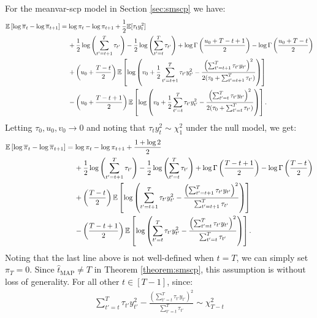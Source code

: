 For the meanvar-scp model in Section \ref{sec:smscp} we have:
\small
\begin{align*}
    \mathbb{E}\left[\log\overline{\pi}_t - \log \overline{\pi}_{t+1} \right] &= \log \pi_t- \log \pi_{t+1} + \frac{1}{2} \mathbb{E}[\tau_ty_t^2] \\
    &\quad \: + \frac{1}{2}\log\left(\sum_{t'=t+1}^T \tau_{t'}\right) - \frac{1}{2}\log\left(\sum_{t'=t}^T \tau_{t'}\right) + \log \Gamma\left(\frac{u_0 + T-t+1}{2}\right) - \log \Gamma\left(\frac{u_0 + T-t}{2}\right)  \\
    &\quad \: + \left(u_0 + \frac{T - t}{2}\right)\mathbb{E}\left[\log\left(v_0 +\frac{1}{2}\sum_{t'=t+1}^T \tau_{t'}y_{t'}^2- \frac{\left(\sum_{t'=t+1}^T \tau_{t'}y_{t'}\right)^2}{2(\tau_0 + \sum_{t'=t+1}^T \tau_{t'})}\right)\right] \\
     &\quad \:- \left(u_0 + \frac{T - t +1}{2}\right)\mathbb{E}\left[\log\left(v_0 +\frac{1}{2}\sum_{t'=t}^T \tau_{t'}y_{t'}^2 - \frac{\left(\sum_{t'=t}^T \tau_{t'}y_{t'}\right)^2}{2(\tau_0 + \sum_{t'=t}^T \tau_{t'})}\right)\right].
\end{align*}
\normalsize
Letting $\tau_0, u_0,v_0 \to 0$ and noting that $\tau_{t}y^2_{t} \sim \chi^2_1$ under the null model, we get:
\small
\begin{align*}
    \mathbb{E}\left[\log\overline{\pi}_t - \log \overline{\pi}_{t+1} \right] &= \log \pi_t- \log \pi_{t+1} + \frac{1 + \log 2}{2} \\
    &\quad \: + \frac{1}{2}\log\left(\sum_{t'=t+1}^T \tau_{t'}\right) - \frac{1}{2}\log\left(\sum_{t'=t}^T \tau_{t'}\right) + \log \Gamma\left(\frac{ T-t+1}{2}\right) - \log \Gamma\left(\frac{T-t}{2}\right)  \\
    &\quad \: + \left(\frac{T - t}{2}\right)\mathbb{E}\left[\log\left(\sum_{t'=t+1}^T \tau_{t'}y_{t'}^2- \frac{\left(\sum_{t'=t+1}^T \tau_{t'}y_{t'}\right)^2}{\sum_{t'=t+1}^T \tau_{t'}}\right)\right] \\
     &\quad \:- \left(\frac{T - t +1}{2}\right)\mathbb{E}\left[\log\left(\sum_{t'=t}^T \tau_{t'}y_{t'}^2 - \frac{\left(\sum_{t'=t}^T \tau_{t'}y_{t'}\right)^2}{\sum_{t'=t}^T \tau_{t'}}\right)\right].
\end{align*}
\normalsize
Noting that the last line above is not well-defined when $t = T$, we can simply set $\pi_T = 0$. Since $\hat{t}_{\text{MAP}} \neq T$ in Theorem \ref{theorem:smscp}, this assumption is without loss of generality. For all other $t \in [T-1]$, since:
\begin{align*}
    \sum_{t'=t}^T \tau_{t'}y_{t'}^2 - \frac{\left(\sum_{t'=t}^T \tau_{t'}y_{t'}\right)^2}{\sum_{t'=t}^T \tau_{t'}} \sim \chi^2_{T-t}
\end{align*}
